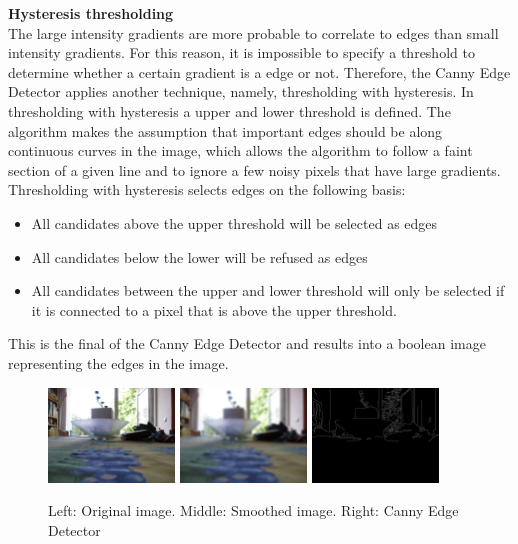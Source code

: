 \documentclass[a4paper]{article}
\begin{document}
\noindent\textbf{Hysteresis thresholding}\\
The large intensity gradients are more probable to correlate to edges than small intensity gradients. For this reason, it is impossible to specify a threshold to determine whether a certain gradient is a edge or not. Therefore, the Canny Edge Detector applies another technique, namely, thresholding with hysteresis. In thresholding with hysteresis a upper and lower threshold is defined. The algorithm makes the assumption that important edges should be along continuous curves in the image, which allows the algorithm to follow a faint section of a given line and to ignore a few noisy pixels that have large gradients. Thresholding with hysteresis selects edges on the following basis:
\begin{itemize}
\item All candidates above the upper threshold will be selected as edges
\item All candidates below the lower will be refused as edges
\item All candidates between the upper and lower threshold will only be selected if it is connected to a pixel that is above the upper threshold.
\end{itemize}
This is the final of the Canny Edge Detector and results into a boolean image representing the edges in the image.

\begin{figure}[!ht]
\centering
\includegraphics[width=0.3\textwidth]{images/gauss_orig.jpg}
\includegraphics[width=0.3\textwidth]{images/gauss_21.png}
\includegraphics[width=0.3\textwidth]{images/canny.png}

\caption{Left: Original image. Middle: Smoothed image. Right: Canny Edge Detector}
\label{canny}
\end{figure}
\end{document}
